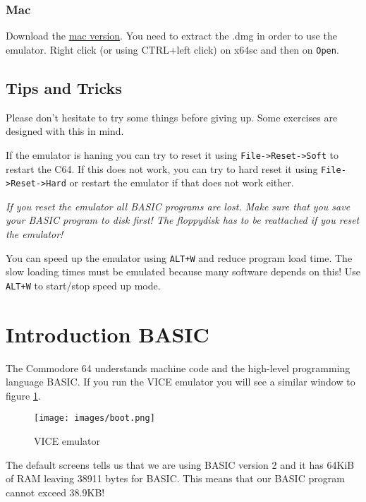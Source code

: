 \documentclass{article}
\begin{document}
\subsubsection{Mac}
Download the \href{http://sourceforge.net/projects/vice-emu/files/releases/binaries/macosx/vice-macosx-cocoa-x86_64-10.12-3.1.dmg/download}{mac version}.
You need to extract the .dmg in order to use the emulator.
Right click (or using CTRL+left click) on x64sc and then on \verb:Open:.

\subsection{Tips and Tricks}

Please don't hesitate to try some things before giving up.
Some exercises are designed with this in mind.

If the emulator is haning you can try to reset it using \verb:File->Reset->Soft: to restart the C64.
If this does not work, you can try to hard reset it using \verb:File->Reset->Hard: or restart the emulator if that does not work either.

\emph{If you reset the emulator all BASIC programs are lost. Make sure that you save your BASIC program to disk first!
The floppydisk has to be reattached if you reset the emulator!}

You can speed up the emulator using \verb:ALT+W: and reduce program load time.
The slow loading times must be emulated because many software depends on this!
Use \verb:ALT+W: to start/stop speed up mode.



\section{Introduction BASIC}

The Commodore 64 understands machine code and the high-level programming language BASIC.
If you run the VICE emulator you will see a similar window to figure \ref{fig:vice}.

\begin{figure}
\centering
\texttt{[image: images/boot.png]}
\caption{VICE emulator}
\label{fig:vice}
\end{figure}

The default screens tells us that we are using BASIC version 2 and it has 64KiB of RAM leaving 38911 bytes for BASIC.
This means that our BASIC program cannot exceed 38.9KB!
\end{document}
